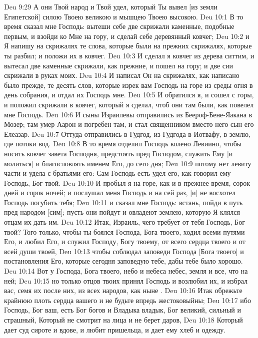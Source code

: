 \vs Deu 9:29 А они Твой народ и Твой удел, который Ты вывел [из земли Египетской] силою Твоею великою и мышцею Твоею высокою.
\vs Deu 10:1 В то время сказал мне Господь: вытеши себе две скрижали каменные, подобные первым, и взойди ко Мне на гору, и сделай себе деревянный ковчег;
\vs Deu 10:2 и Я напишу на скрижалях те слова, которые были на прежних скрижалях, которые ты разбил; и положи их в ковчег.
\vs Deu 10:3 И сделал я ковчег из дерева ситтим, и вытесал две каменные скрижали, как прежние, и пошел на гору; и две сии скрижали  в руках моих.
\vs Deu 10:4 И написал Он на скрижалях, как написано было прежде, те десять слов, которые изрек вам Господь на горе из среды огня в день собрания, и отдал их Господь мне.
\vs Deu 10:5 И обратился я, и сошел с горы, и положил скрижали в ковчег, который я сделал, чтоб они там были, как повелел мне Господь.
\vs Deu 10:6 И сыны Израилевы отправились из Беероф-Бене-Яакана в Мозер; там умер Аарон и погребен там, и стал священником вместо него сын его Елеазар.
\vs Deu 10:7 Оттуда отправились в Гудгод, из Гудгода в Иотвафу, в землю, где потоки вод.
\vs Deu 10:8 В то время отделил Господь колено Левиино, чтобы носить ковчег завета Господня, предстоять пред Господом, служить Ему [и молиться] и благословлять именем Его,  до сего дня;
\vs Deu 10:9 потому нет левиту части и удела с братьями его: Сам Господь есть удел его, как говорил ему Господь, Бог твой.
\vs Deu 10:10 И пробыл я на горе, как и в прежнее время, сорок дней и сорок ночей; и послушал меня Господь и на сей раз, [и] не восхотел Господь погубить тебя;
\vs Deu 10:11 и сказал мне Господь: встань, пойди в путь пред народом [сим]; пусть они пойдут и овладеют землею, которую Я клялся отцам их дать им.
\vs Deu 10:12 Итак, Израиль, чего требует от тебя Господь, Бог твой? Того только, чтобы ты боялся Господа, Бога твоего, ходил всеми путями Его, и любил Его, и служил Господу, Богу твоему, от всего сердца твоего и от всей души твоей,
\vs Deu 10:13 чтобы соблюдал заповеди Господа [Бога твоего] и постановления Его, которые сегодня заповедую тебе, дабы тебе было хорошо.
\vs Deu 10:14 Вот у Господа, Бога твоего, небо и небеса небес, земля и все, что на ней;
\vs Deu 10:15 но только отцов твоих принял Господь и возлюбил их, и избрал вас, семя их после них, из всех народов, как ныне .
\vs Deu 10:16 Итак обрежьте крайнюю плоть сердца вашего и не будьте впредь жестоковыйны;
\vs Deu 10:17 ибо Господь, Бог ваш, есть Бог богов и Владыка владык, Бог великий, сильный и страшный, Который не смотрит на лица и не берет даров,
\vs Deu 10:18 Который дает суд сироте и вдове, и любит пришельца, и дает ему хлеб и одежду.
